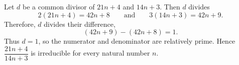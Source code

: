 Let $d$ be a common divisor of $21n+4$ and $14n+3$. Then $d$ divides
\[
    2(21n+4)=42n+8
    \qquad\text{and}\qquad
    3(14n+3)=42n+9.
\]
Therefore, $d$ divides their difference,
\[
    (42n+9)-(42n+8)=1.
\]
Thus $d=1$, so the numerator and denominator are relatively prime. Hence
$\dfrac{21n+4}{14n+3}$ is irreducible for every natural number $n$.
